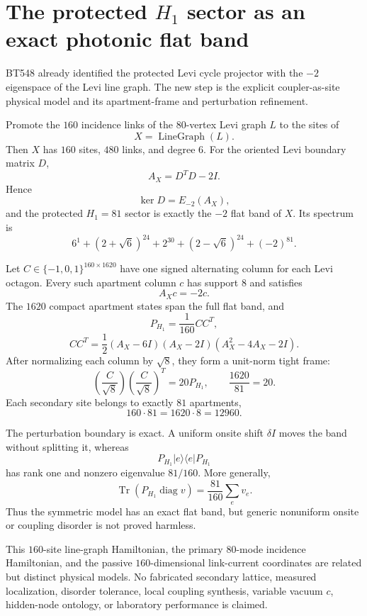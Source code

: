\section{The protected $H_1$ sector as an exact photonic flat band}
\label{sec:bt4019-4024}

BT548 already identified the protected Levi cycle projector with the
$-2$ eigenspace of the Levi line graph.  The new step is the explicit
coupler-as-site physical model and its apartment-frame and perturbation
refinement.

Promote the $160$ incidence links of the $80$-vertex Levi graph $L$ to the
sites of
\[
 X=\operatorname{LineGraph}(L).
\]
Then $X$ has $160$ sites, $480$ links, and degree $6$.  For the oriented
Levi boundary matrix $D$,
\[
 \boxed{A_X=D^TD-2I.}
\]
Hence
\[
 \boxed{\ker D=E_{-2}(A_X)},
\]
and the protected $H_1=81$ sector is exactly the $-2$ flat band of $X$.
Its spectrum is
\[
 6^1+(2+\sqrt6)^{24}+2^{30}+(2-\sqrt6)^{24}+(-2)^{81}.
\]

Let $C\in\{-1,0,1\}^{160\times1620}$ have one signed alternating column
for each Levi octagon.  Every such apartment column $c$ has support $8$ and
satisfies
\[
 A_Xc=-2c.
\]
The $1620$ compact apartment states span the full flat band, and
\[
 P_{H_1}=\frac1{160}CC^T,
\]
\[
 CC^T=\frac12(A_X-6I)(A_X-2I)(A_X^2-4A_X-2I).
\]
After normalizing each column by $\sqrt8$, they form a unit-norm tight frame:
\[
 \boxed{
 \left(\frac C{\sqrt8}\right)
 \left(\frac C{\sqrt8}\right)^T=20P_{H_1}
 },
\qquad \frac{1620}{81}=20.
\]
Each secondary site belongs to exactly $81$ apartments,
\[
 \boxed{160\cdot81=1620\cdot8=12960.}
\]

The perturbation boundary is exact.  A uniform onsite shift $\delta I$ moves
the band without splitting it, whereas
\[
 P_{H_1}|e\rangle\langle e|P_{H_1}
\]
has rank one and nonzero eigenvalue $81/160$.  More generally,
\[
 \operatorname{Tr}(P_{H_1}\operatorname{diag}v)
 =\frac{81}{160}\sum_e v_e.
\]
Thus the symmetric model has an exact flat band, but generic nonuniform onsite
or coupling disorder is not proved harmless.

This $160$-site line-graph Hamiltonian, the primary $80$-mode incidence
Hamiltonian, and the passive $160$-dimensional link-current coordinates are
related but distinct physical models.  No fabricated secondary lattice,
measured localization, disorder tolerance, local coupling synthesis, variable
vacuum $c$, hidden-node ontology, or laboratory performance is claimed.
